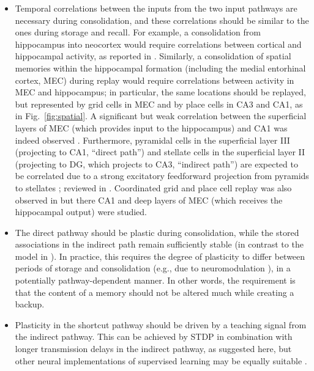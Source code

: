\begin{itemize}
\item[(1)] Temporal correlations between the inputs from the two input pathways are necessary during consolidation, and these correlations should be similar to the ones during storage and recall.
For example,  a consolidation from hippocampus into neocortex would require correlations between cortical and hippocampal activity, as reported in \cite{Ji2007}.
Similarly, a consolidation of spatial memories within the hippocampal formation (including the medial entorhinal cortex, MEC) during replay would require correlations between activity in MEC and hippocampus; in particular, the same locations should be replayed, but represented by grid cells in MEC and by place cells in CA3 and CA1, as in Fig.~\ref{fig:spatial}. A significant but weak correlation between the superficial layers of MEC (which provides input to the hippocampus) and CA1 was indeed observed \cite{ONeill2017}. Furthermore, pyramidal cells in the superficial layer III (projecting to CA1, ``direct path'') and stellate cells in the superficial layer II (projecting to DG, which projects to CA3, ``indirect path'') are expected to be correlated due to a strong excitatory feedforward projection from pyramids to stellates \cite{Winterer2017}; reviewed in \cite{Tukker2022}. Coordinated grid and place cell replay was also observed in \cite{Olafsdottir2016} but there CA1 and deep layers of MEC (which receives the hippocampal output) were studied.



\item[(2)] The direct pathway should be plastic during consolidation, while the stored associations in the indirect path remain sufficiently stable
(in contrast to the model in \cite{Tome2020}). In practice, this requires the degree of plasticity to differ between periods of storage and consolidation (e.g., due to neuromodulation \cite{Hasselmo1999a, Papouin2017}), in a potentially pathway-dependent manner. In other words, the requirement is that the content of a memory should not be altered much while creating a backup.

\item[(3)] Plasticity in the shortcut pathway should be driven by a teaching signal from the indirect pathway. This can be achieved by STDP in combination with longer transmission delays in the indirect pathway, as suggested here, but other neural implementations of supervised learning may be equally suitable \cite{Legenstein2005, Pfister2006, Urbanczik2014}.



\end{itemize}
